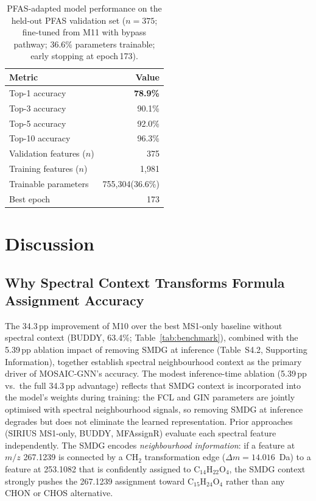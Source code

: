 \documentclass[journal=jcisd8]{achemso}
\begin{document}
\begin{table}[H]
\centering
\small
\caption{PFAS-adapted model performance on the held-out PFAS validation set
  ($n=375$; fine-tuned from M11 with bypass pathway; 36.6\% parameters trainable;
  early stopping at epoch\,173).}
\label{tab:pfas_results}
\footnotesize
\begin{tabular}{lr}
\toprule
\textbf{Metric} & \textbf{Value} \\
\midrule
Top-1 accuracy   & \textbf{78.9\%} \\
Top-3 accuracy   & 90.1\% \\
Top-5 accuracy   & 92.0\% \\
Top-10 accuracy  & 96.3\% \\
\midrule
Validation features ($n$)  & 375 \\
Training features ($n$)     & 1{,}981 \\
Trainable parameters        & 755,304\;(36.6\%) \\
Best epoch                  & 173 \\
\bottomrule
\end{tabular}
\end{table}

\section{Discussion}
\label{sec:discussion}

\subsection{Why Spectral Context Transforms Formula Assignment Accuracy}

The 34.3\,pp improvement of M10 over the best MS1-only baseline without spectral context
(BUDDY, 63.4\%; Table~\ref{tab:benchmark}), combined with the 5.39\,pp ablation impact
of removing SMDG at inference (Table~S4.2, Supporting Information), together establish
spectral neighbourhood context as the primary driver of MOSAIC-GNN's accuracy.
The modest inference-time ablation (5.39\,pp vs.~the full 34.3\,pp advantage)
reflects that SMDG context is incorporated into the model's weights during training:
the FCL and GIN parameters are jointly optimised with spectral neighbourhood signals,
so removing SMDG at inference degrades but does not eliminate the learned representation.  Prior approaches (SIRIUS MS1-only, BUDDY, MFAssignR) evaluate each
spectral feature independently.  The SMDG encodes \emph{neighbourhood information}: if
a feature at $m/z$ 267.1239 is connected by a CH$_2$ transformation edge
($\Delta m = 14.016$~Da) to a feature at 253.1082 that is confidently assigned to
$\mathrm{C_{14}H_{22}O_4}$, the SMDG context strongly pushes the 267.1239 assignment
toward $\mathrm{C_{15}H_{24}O_4}$ rather than any CHON or CHOS alternative.
\end{document}
